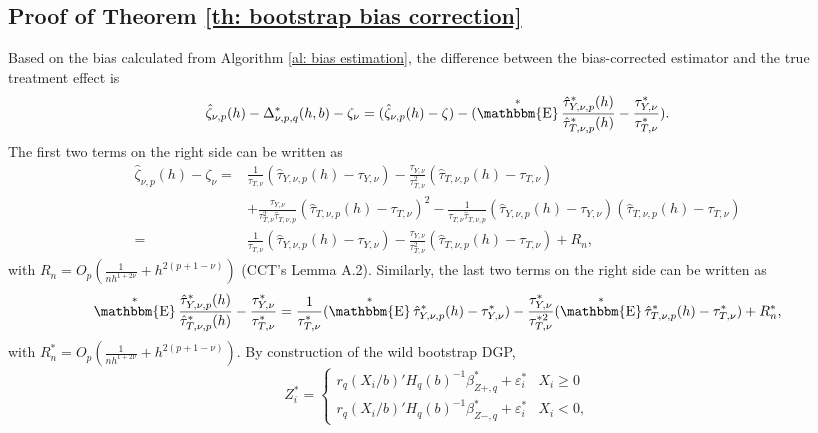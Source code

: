 \documentclass[12pt,]{article}
\DeclareMathOperator{\1}{\mathbbm{1}}
\DeclareMathOperator{\E}{\mathbbm{E}}
\begin{document}
\subsection{Proof of Theorem \ref{th: bootstrap bias correction}}
\label{se: proof 1}

Based on the bias calculated from Algorithm \ref{al: bias estimation}, the difference between the bias-corrected estimator and the true treatment effect is
\begin{equation*}
	\hat\zeta_{\nu, p}(h) - \Delta_{\nu, p, q}^*(h,b) - \zeta_{\nu} \\
	= (\hat\zeta_{\nu, p}(h) - \zeta) - (\E^* \frac{\hat \tau_{Y, \nu, p}^*(h)}{\hat \tau_{T, \nu, p}^*(h)} - \frac{\tau_{Y, \nu}^*}{\tau_{T, \nu}^*}).
\end{equation*}
The first two terms on the right side can be written as
\begin{align*}
	\hat\zeta_{\nu, p}(h) - \zeta_{\nu}
	= & \frac{1}{\tau_{T, \nu}} (\hat\tau_{Y, \nu, p}(h) - \tau_{Y, \nu}) 
	    - \frac{\tau_{Y, \nu}}{\tau_{T, \nu}^2} (\hat\tau_{T, \nu, p}(h) - \tau_{T, \nu}) \\
	  & + \frac{\tau_{Y, \nu}}{\tau_{T, \nu}^2 \hat \tau_{T, \nu, p}} (\hat\tau_{T, \nu, p}(h) - \tau_{T, \nu})^2 
	    - \frac{1}{\tau_{T, \nu} \hat \tau_{T, \nu, p}} (\hat\tau_{Y, \nu, p}(h) - \tau_{Y, \nu}) (\hat\tau_{T, \nu, p}(h) - \tau_{T, \nu}) \\
	= & \frac{1}{\tau_{T, \nu}} (\hat\tau_{Y, \nu, p}(h) - \tau_{Y, \nu}) 
	    - \frac{\tau_{Y, \nu}}{\tau_{T, \nu}^2} (\hat\tau_{T, \nu, p}(h) - \tau_{T, \nu}) + R_n,
\end{align*}
with $R_n = O_p(\frac{1}{nh^{1 + 2 \nu}} + h^{2 (p + 1 - \nu)})$ (CCT's Lemma A.2). Similarly, the last two terms on the right side can be written as
\begin{equation*}
	\E^* \frac{\hat \tau_{Y, \nu, p}^*(h)}{\hat \tau_{T, \nu, p}^*(h)} - \frac{\tau_{Y, \nu}^*}{\tau_{T, \nu}^*}
	=  \frac{1}{\tau_{T, \nu}^*} (\E^* \hat \tau_{Y, \nu, p}^*(h) - \tau_{Y, \nu}^*) - 
	   \frac{\tau_{Y, \nu}^*}{\tau_{T, \nu}^{*2}} (\E^* \hat \tau_{T, \nu, p}^*(h) - \tau_{T, \nu}^*) + R_n^*,
\end{equation*}
with $R_n^* = O_p(\frac{1}{nh^{1 + 2 \nu}} + h^{2 (p + 1 - \nu)})$. By construction of the wild bootstrap DGP,
\begin{equation*}
	Z_i^* =
	\begin{cases}
	r_q(X_i/b)'H_q(b)^{-1} \beta_{Z+,q}^* + \varepsilon_i^* & X_i \geq 0 \\
	r_q(X_i/b)'H_q(b)^{-1} \beta_{Z-,q}^* + \varepsilon_i^* & X_i < 0,
	\end{cases}
\end{equation*}
\end{document}

